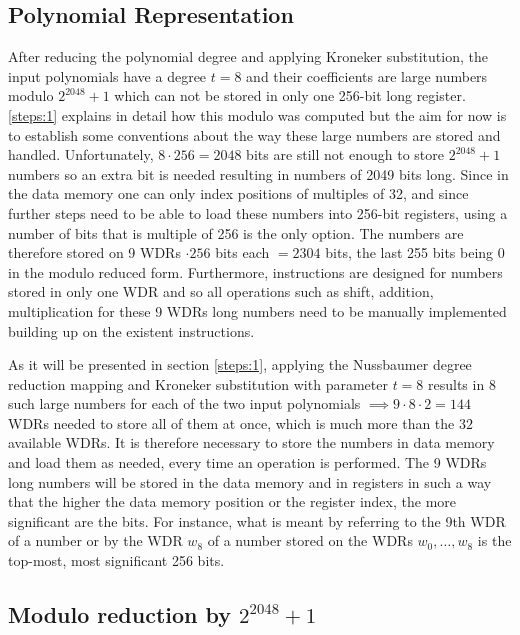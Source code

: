 \subsection{Polynomial Representation}

After reducing the polynomial degree and applying Kroneker substitution, the input polynomials have a degree $t=8$ and their coefficients are large numbers modulo $2^{2048} + 1$ which can not be stored in only one 256-bit long register. \cref{steps:1} explains in detail how this modulo was computed but the aim for now is to establish some conventions about the way these large numbers are stored and handled. Unfortunately, $8 \cdot 256 = 2048$ bits are still not enough to store $2^{2048} + 1$ numbers so an extra bit is needed resulting in numbers of 2049 bits long. Since in the data memory one can only index positions of multiples of 32, and since further steps need to be able to load these numbers into 256-bit registers, using a number of bits that is multiple of 256 is the only option. The numbers are therefore stored on 9 WDRs $ \cdot 256$ bits each $= 2304$ bits, the last 255 bits being 0 in the modulo reduced form. Furthermore, instructions are designed for numbers stored in only one WDR and so all operations such as shift, addition, multiplication for these 9 WDRs long numbers need to be manually implemented building up on the existent instructions. 

As it will be presented in section \ref{steps:1}, applying the Nussbaumer degree reduction mapping and Kroneker substitution with parameter $t=8$ results in $8$ such large numbers for each of the two input polynomials $\implies 9 \cdot 8 \cdot 2 = 144$ WDRs needed to store all of them at once, which is much more than the $32$ available WDRs. It is therefore necessary to store the numbers in data memory and load them as needed, every time an operation is performed. The 9 WDRs long numbers will be stored in the data memory and in registers in such a way that the higher the data memory position or the register index, the more significant are the bits. For instance, what is meant by referring to the 9th WDR of a number or by the WDR $w_8$ of a number stored on the WDRs $w_0, \ldots, w_8$ is the top-most, most significant 256 bits.


\subsection{Modulo reduction by $2^{2048} + 1$}

